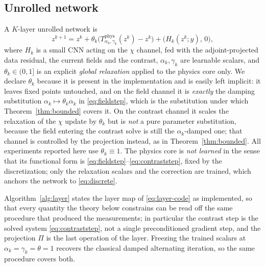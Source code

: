 \documentclass[journal,cmes,article,submit,moreauthors,pdftex]{Definitions/tsp}
\begin{document}
\subsection{Unrolled network}
A $K$-layer unrolled network is
\begin{equation}\label{eq:layer-code}
z^{k+1} = z^{k}+\theta_k\big(T^{\mathrm{phys}}_{\alpha_k,\gamma_k}(z^{k})-z^{k}\big)+\big(H_k(z^{k};y),\,0\big),
\end{equation}
where $H_k$ is a small CNN acting on the $\chi$ channel, fed with the adjoint-projected data residual, the current fields and the contrast, $\alpha_k,\gamma_k$ are
learnable scalars, and $\theta_k\in(0,1]$ is an explicit \emph{global relaxation} applied to the
physics core only. We declare $\theta_k$ because it is present in the implementation and is easily
left implicit: it leaves fixed points untouched, and on the field channel it is \emph{exactly} the
damping substitution $\alpha_k\mapsto\theta_k\alpha_k$ in \eqref{eq:fieldstep}, which is the
substitution under which Theorem~\ref{thm:bounded} covers it. On the contrast channel it scales the
relaxation of the $\chi$ update by $\theta_k$ but is \emph{not} a pure parameter substitution,
because the field entering the contrast solve is still the $\alpha_k$-damped one; that channel is
controlled by the projection instead, as in Theorem~\ref{thm:bounded}. All experiments reported
here use $\theta_k\equiv1$. The physics core is \emph{not learned} in the sense that its functional
form is \eqref{eq:fieldstep}--\eqref{eq:contraststep}, fixed by the discretization; only the
relaxation scalars and the correction are trained, which anchors the network to \eqref{eq:discrete}.

Algorithm~\ref{alg:layer} states the layer map of \eqref{eq:layer-code} as implemented, so that
every quantity the theory below constrains can be read off the same procedure that produced the
measurements; in particular the contrast step is the solved system \eqref{eq:contraststep}, not a
single preconditioned gradient step, and the projection $\Pi$ is the last operation of the layer.
Freezing the trained scalars at $\alpha_k=\gamma_k=\theta=1$ recovers the classical damped
alternating iteration, so the same procedure covers both.
\end{document}
